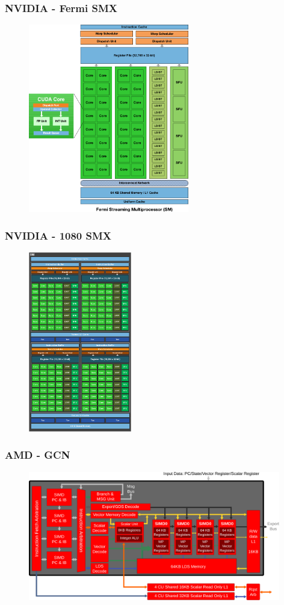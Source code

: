 \begin{frame}
\frametitle{NVIDIA - Fermi SMX}
	\begin{figure}[h]
	\includegraphics[width=7cm,keepaspectratio]{pics/gpu/fermi}
	\end{figure}
\end{frame}

\begin{frame}
\frametitle{NVIDIA - 1080 SMX}
	\begin{figure}[h]
	\includegraphics[width=4.5cm,keepaspectratio]{pics/gpu/1080SMX}
	\end{figure}
\end{frame}

\begin{frame}
\frametitle{AMD - GCN}
	\begin{figure}[h]
	\includegraphics[width=11cm,keepaspectratio]{pics/gpu/gcn}
	\end{figure}
\end{frame}

